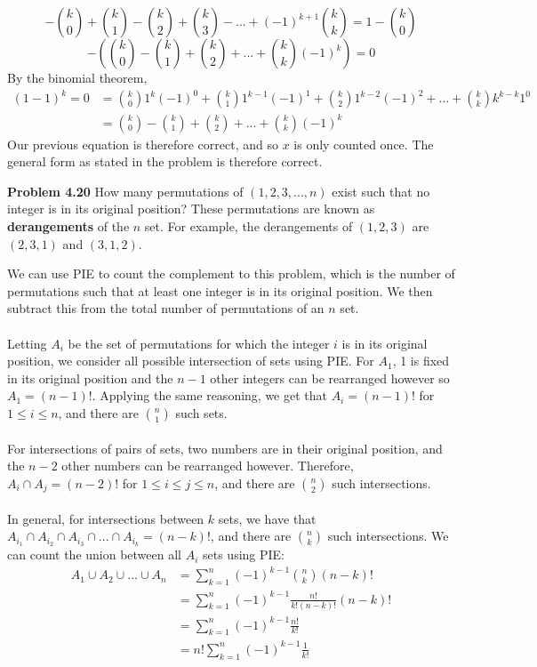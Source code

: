 \documentclass[11pt]{scrartcl}
\begin{document}
$$-{k \choose 0}+{k \choose 1}-{k \choose 2}+{k \choose 3}-...+(-1)^{k+1}{k \choose k}=1-{k \choose 0}$$
$$-\left({k \choose 0}-{k \choose 1}+{k \choose 2}+...+{k \choose k}(-1)^k\right)=0$$
By the binomial theorem, 
\begin{align*}
    (1-1)^k=0 &={k \choose 0}1^{k}(-1)^0+{k \choose 1}1^{k-1}(-1)^1+{k \choose 2}1^{k-2}(-1)^2+...+{k \choose k}k^{k-k}1^0 \\
              &={k \choose 0}-{k \choose 1}+{k \choose 2}+...+{k \choose k}(-1)^k
\end{align*}
Our previous equation is therefore correct, and so $x$ is only counted once. The general form as stated in the problem is therefore correct. 
\begin{tcolorbox}
\textbf{Problem 4.20} How many permutations of $(1, 2, 3,...,n)$ exist such that no integer is in its original position? These permutations are known as \textbf{derangements} of the $n$ set. For example, the derangements of $(1, 2, 3)$ are $(2, 3, 1)$ and $(3, 1, 2)$. 
\end{tcolorbox}
 We can use PIE to count the complement to this problem, which is the number of permutations such that at least one integer is in its original position. We then subtract this from the total number of permutations of an $n$ set. \\
\\
\noindent 
Letting $A_i$ be the set of permutations for which the integer $i$ is in its original position, we consider all possible intersection of sets using PIE. For $A_1$, 1 is fixed in its original position and the $n-1$ other integers can be rearranged however so $A_1=(n-1)!$. Applying the same reasoning, we get that $A_i=(n-1)!$ for $1 \leq i \leq n$, and there are $n \choose 1$ such sets. \\
\\
\noindent 
For intersections of pairs of sets, two numbers are in their original position, and the $n-2$ other numbers can be rearranged however. Therefore, ${A_i} \cap {A_j}=(n-2)!$ for $1 \leq i \leq j \leq n$, and there are $n \choose 2$ such intersections. \\
\\
\noindent 
In general, for intersections between $k$ sets, we have that${A_{i_1}} \cap {A_{i_2}} \cap {A_{i_3}} \cap...\cap {A_{i_k}}=(n-k)!$, and there are $n \choose k$ such intersections. We can count the union between all $A_i$ sets using PIE: 
\begin{align*}
    {A_1 \cup A_2 \cup...\cup A_n} &=  \sum_{k=1}^{n} (-1)^{k-1}{n      \choose k}(n-k)!     \\
                                   &= \sum_{k=1}^{n} (-1)^{k-1} \frac{n!}{k!(n-k)!}(n-k)! \\
                                   &= \sum_{k=1}^{n} (-1)^{k-1}  \frac{n!}{k!} \\
                                   &= n!\sum_{k=1}^{n} (-1)^{k-1}\frac{1}{k!}
\end{align*}
\end{document}
